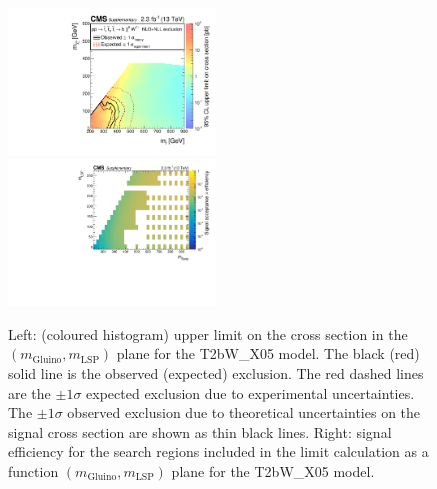 \clearpage
\begin{figure}[t]
  \begin{center}
    \includegraphics[width=0.49\textwidth]{RA1T2bW-X05XSEC_aux} \, 
    \includegraphics[width=0.49\textwidth]{T2bW_X05_merging_4_cats_aux} \,     
  \end{center}
  \caption{Left: (coloured histogram) upper limit on the cross section in the $(m_{\mathrm{Gluino}},m_{\mathrm{LSP}})$ plane for the T2bW\_X05 model. 
  The black (red) solid line is the observed (expected) exclusion. The red dashed lines are the $\pm1\sigma$ expected exclusion due to experimental uncertainties. 
  The $\pm1\sigma$ observed exclusion due to theoretical uncertainties on the signal cross section are shown as thin black lines. 
  Right: signal efficiency for the search regions included in the limit calculation as a function $(m_{\mathrm{Gluino}},m_{\mathrm{LSP}})$ plane for the T2bW\_X05 model. 
  \label{fig:T2bW_X05_excl}}
\end{figure}

